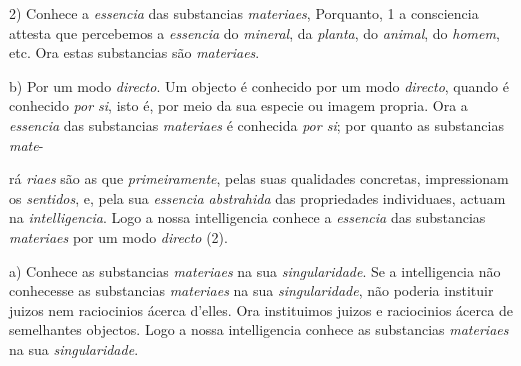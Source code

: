 

2) Conhece a \emph{essencia} das substancias \emph{materiaes}, Porquanto, 1 a consciencia attesta que percebemos a \emph{essencia} do \emph{mineral}, da \emph{planta}, do \emph{animal}, do \emph{homem}, etc. Ora estas substancias são \emph{materiaes}. \textbar{}

b) Por um modo \emph{directo}. Um objecto é conhecido por um modo \emph{directo}, quando é conhecido \emph{por si}, isto é, por meio da sua especie ou imagem propria. Ora a \emph{essencia} das substancias \textbar{} \emph{materiaes} é conhecida \emph{por si}; por quanto as substancias \emph{mate}-

rá \emph{riaes} são as que \emph{primeiramente}, pelas suas qualidades concretas, impressionam os \emph{sentidos}, e, pela sua \emph{essencia abstrahida} \textbar{} das propriedades individuaes, actuam na \emph{intelligencia}. Logo a nossa intelligencia conhece a \emph{essencia} das substancias \emph{materiaes} por um modo \emph{directo} (2).


 

a) Conhece as substancias \emph{materiaes} na sua \emph{singularidade}. Se a intelligencia não conhecesse as substancias \emph{materiaes} na sua \emph{singularidade}, não poderia instituir juizos nem raciocinios ácerca d'elles. Ora instituimos juizos e raciocinios ácerca de semelhantes objectos. Logo a nossa intelligencia conhece as substancias \emph{materiaes} na sua \emph{singularidade}.

